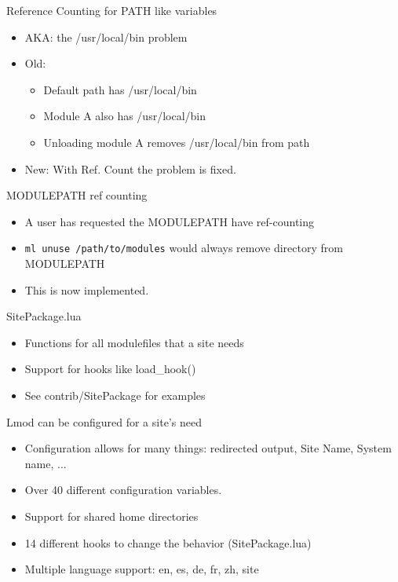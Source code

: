 \documentclass{beamer}
\begin{document}
\begin{frame}{Reference Counting for PATH like variables}
  \begin{itemize}
    \item AKA: the /usr/local/bin problem
    \item Old:
      \begin{itemize}
        \item Default path has /usr/local/bin
        \item Module A also has /usr/local/bin
        \item Unloading module A removes /usr/local/bin from path
      \end{itemize}
    \item New: With Ref. Count the problem is fixed.
  \end{itemize}
\end{frame}

\begin{frame}{MODULEPATH ref counting}
  \begin{itemize}
    \item A user has requested the MODULEPATH have ref-counting
    \item \texttt{ml unuse /path/to/modules} would always remove
      directory from MODULEPATH
    \item This is now implemented.
  \end{itemize}
\end{frame}

\begin{frame}{SitePackage.lua}
  \begin{itemize}
    \item Functions for all modulefiles that a site needs
    \item Support for hooks like load\_hook()
    \item See contrib/SitePackage for examples
  \end{itemize}
\end{frame}

\begin{frame}{Lmod can be configured for a site's need}
  \begin{itemize}
    \item Configuration allows for many things: redirected output,
      Site Name, System name, ...
    \item Over 40 different configuration variables.
    \item Support for shared home directories
    \item 14 different hooks to change the behavior (SitePackage.lua)
    \item Multiple language support: en, es, de, fr, zh, site
  \end{itemize}
\end{frame}
\end{document}
